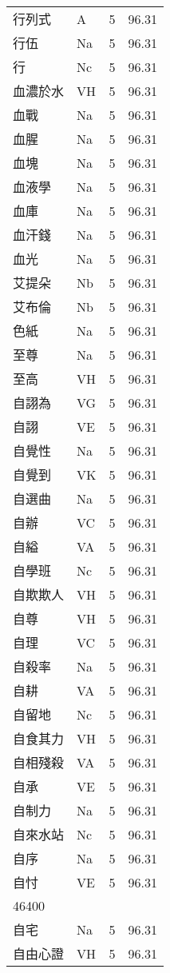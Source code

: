 \documentclass[twocolumn]{book}
\begin{document}
\begin{supertabular}{llrr}
行列式 & A & 5 &  96.31\\
行伍 & Na & 5 &  96.31\\
行 & Nc & 5 &  96.31\\
血濃於水 & VH & 5 &  96.31\\
血戰 & Na & 5 &  96.31\\
血腥 & Na & 5 &  96.31\\
血塊 & Na & 5 &  96.31\\
血液學 & Na & 5 &  96.31\\
血庫 & Na & 5 &  96.31\\
血汗錢 & Na & 5 &  96.31\\
血光 & Na & 5 &  96.31\\
艾提朵 & Nb & 5 &  96.31\\
艾布倫 & Nb & 5 &  96.31\\
色紙 & Na & 5 &  96.31\\
至尊 & Na & 5 &  96.31\\
至高 & VH & 5 &  96.31\\
自詡為 & VG & 5 &  96.31\\
自詡 & VE & 5 &  96.31\\
自覺性 & Na & 5 &  96.31\\
自覺到 & VK & 5 &  96.31\\
自選曲 & Na & 5 &  96.31\\
自辦 & VC & 5 &  96.31\\
自縊 & VA & 5 &  96.31\\
自學班 & Nc & 5 &  96.31\\
自欺欺人 & VH & 5 &  96.31\\
自尊 & VH & 5 &  96.31\\
自理 & VC & 5 &  96.31\\
自殺率 & Na & 5 &  96.31\\
自耕 & VA & 5 &  96.31\\
自留地 & Nc & 5 &  96.31\\
自食其力 & VH & 5 &  96.31\\
自相殘殺 & VA & 5 &  96.31\\
自承 & VE & 5 &  96.31\\
自制力 & Na & 5 &  96.31\\
自來水站 & Nc & 5 &  96.31\\
自序 & Na & 5 &  96.31\\
自忖 & VE & 5 &  96.31\\
46400\\
自宅 & Na & 5 &  96.31\\
自由心證 & VH & 5 &  96.31\\

\end{supertabular}
\end{document}

